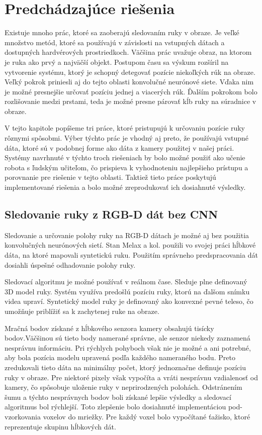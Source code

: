 \chapter{Predchádzajúce riešenia}\label{chap:previous_solutions}

Existuje mnoho prác, ktoré sa zaoberajú sledovaním ruky v obraze. Je veľké množstvo metód, ktoré sa používajú v závislosti na vstupných dátach a dostupných hardvérových prostriedkoch. Väčšina prác uvažuje obraz, na ktorom je ruka ako prvý a najväčší objekt. Postupom času sa výskum rozšíril na vytvorenie systému, ktorý je schopný detegovať pozície niekoľkých rúk na obraze. Veľký pokrok priniesli aj do tejto oblasti konvolučné neurónové siete. %
Vďaka nim je možné presnejšie určovať pozíciu jednej a viacerých rúk. Ďalším pokrokom bolo rozlišovanie medzi prstami, teda je možné presne párovať kĺb ruky na súradnice v obraze.

V tejto kapitole popíšeme tri práce, ktoré pristupujú k určovaniu pozície ruky rôznymi spôsobmi. Výber týchto prác je vhodný aj preto, že používajú vstupné dáta, ktoré sú v podobnej forme ako dáta z kamery použitej v našej práci. Systémy navrhnuté v týchto troch riešeniach by bolo možné použiť ako učenie robota s ľudským učiteľom, čo prispieva k vyhodnoteniu najlepšieho prístupu a porovnanie pre riešenie v tejto oblasti. Taktiež tieto práce poskytujú implementované riešenia a bolo možné zreprodukovať ich dosiahnuté výsledky.

\section{Sledovanie ruky z RGB-D dát bez CNN}\label{chpt:depthBase}
Sledovanie a určovanie polohy ruky na RGB-D dátach je možné aj bez použitia konvolučných neurónových sietí. Stan Melax a kol. \cite{DBLP:journals/corr/MelaxKO17} použili vo svojej práci hĺbkové dáta, na ktoré mapovali syntetickú ruku. Použitím správneho predspracovania dát dosiahli úspešné odhadovanie polohy ruky. 

Sledovací algoritmu je možné používať v reálnom čase. Sleduje plne definovaný 3D model ruky. Systém využíva predošlú pozíciu ruky, ktorú na ďalšom snímku videa upraví. Syntetický model ruky je definovaný ako konvexné pevné teleso, čo umožňuje priblížiť sa k zachytenej ruke na obraze.

Mračná bodov získané z hĺbkového senzora kamery obsahujú tisícky bodov.Väčšinou sú tieto body namerané správne, ale senzor niekedy zaznamená nesprávnu informáciu. Pri rýchlych pohyboch však nie je možné a ani potrebné, aby bola pozícia modelu upravená podľa každého nameraného bodu. Preto zredukovali tieto dáta na minimálny počet, ktorý jednoznačne definuje pozíciu ruky v obraze. Pre niektoré pixely však vypočíta a vráti nesprávnu vzdialenosť od kamery, čo spôsobuje uloženie ruky v neprirodzených polohách. Odstránením šumu a týchto nesprávnych bodov boli získané lepšie výsledky a sledovací algoritmus bol rýchlejší. Toto zlepšenie bolo dosiahnuté implementáciou pod-vzorkovania voxelov do mriežky. Pre každý voxel bolo vypočítané ťažisko, ktoré reprezentuje skupinu hĺbkových dát.

